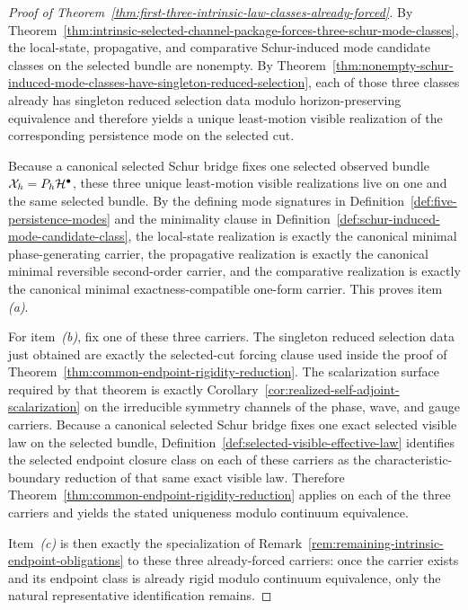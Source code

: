\begin{proof}[Proof of Theorem~\ref{thm:first-three-intrinsic-law-classes-already-forced}]
\label{proof:thm:first-three-intrinsic-law-classes-already-forced}
By
Theorem~\ref{thm:intrinsic-selected-channel-package-forces-three-schur-mode-classes},
the local-state, propagative, and comparative Schur-induced mode candidate
classes on the selected bundle are nonempty. By
Theorem~\ref{thm:nonempty-schur-induced-mode-classes-have-singleton-reduced-selection},
each of those three classes already has singleton reduced selection data
modulo horizon-preserving equivalence and therefore yields a unique
least-motion visible realization of the corresponding persistence mode on the
selected cut.

Because a canonical selected Schur bridge fixes one selected observed bundle
\(\mathcal X_h=P_h\mathcal{H}^\bullet\), these three unique least-motion visible
realizations live on one and the same selected bundle. By the defining mode
signatures in Definition~\ref{def:five-persistence-modes} and the minimality
clause in Definition~\ref{def:schur-induced-mode-candidate-class}, the
local-state realization is exactly the canonical minimal phase-generating
carrier, the propagative realization is exactly the canonical minimal
reversible second-order carrier, and the comparative realization is exactly
the canonical minimal exactness-compatible one-form carrier. This proves item
\emph{(a)}.

For item~\emph{(b)}, fix one of these three carriers. The singleton reduced
selection data just obtained are exactly the selected-cut forcing clause used
inside the proof of Theorem~\ref{thm:common-endpoint-rigidity-reduction}.
The scalarization surface required by that theorem is exactly
Corollary~\ref{cor:realized-self-adjoint-scalarization} on the irreducible
symmetry channels of the phase, wave, and gauge carriers. Because a canonical
selected Schur bridge fixes one exact selected visible law on the selected
bundle, Definition~\ref{def:selected-visible-effective-law} identifies the
selected endpoint closure class on each of these carriers as the
characteristic-boundary reduction of that same exact visible law. Therefore
Theorem~\ref{thm:common-endpoint-rigidity-reduction} applies on each of the
three carriers and yields the stated uniqueness modulo continuum equivalence.

Item~\emph{(c)} is then exactly the specialization of
Remark~\ref{rem:remaining-intrinsic-endpoint-obligations} to these three
already-forced carriers: once the carrier exists and its endpoint class is
already rigid modulo continuum equivalence, only the natural representative
identification remains.
\end{proof}

